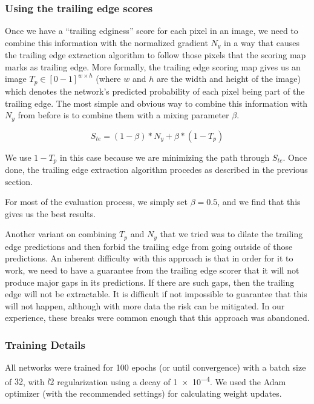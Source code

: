 \subsubsection{Using the trailing edge scores}

Once we have a ``trailing edginess'' score for each pixel in an image, we need to combine this information with the normalized gradient $N_y$ in a way that causes the trailing edge extraction algorithm to follow those pixels that the scoring map marks as trailing edge.
More formally, the trailing edge scoring map gives us an image $T_p \in [0-1]^{w \times h}$ (where $w$ and $h$ are the width and height of the image) which denotes the network's predicted probability of each pixel being part of the trailing edge.
The most simple and obvious way to combine this information with $N_y$ from before is to combine them with a mixing parameter $\beta$.

\begin{equation}
S_{te} = (1 - \beta)*N_y + \beta*(1 - T_p)
\end{equation}

We use $1 - T_p$ in this case because we are minimizing the path through $S_{te}$.
Once done, the trailing edge extraction algorithm procedes as described in the previous section.

For most of the evaluation process, we simply set $\beta = 0.5$, and we find that this gives us the best results.

Another variant on combining $T_p$ and $N_y$ that we tried was to dilate the trailing edge predictions and then forbid the trailing edge from going outside of those predictions.
An inherent difficulty with this approach is that in order for it to work, we need to have a guarantee from the trailing edge scorer that it will not produce major gaps in its predictions.
If there are such gaps, then the trailing edge will not be extractable.
It is difficult if not impossible to guarantee that this will not happen, although with more data the risk can be mitigated.
In our experience, these breaks were common enough that this approach was abandoned.


\subsubsection{Training Details}

All networks were trained for 100 epochs (or until convergence) with a batch size of $32$, with $l2$ regularization using a decay of \num{1e-4}.
We used the Adam optimizer \cite{kingma2014adam} (with the recommended settings) for calculating weight updates.

